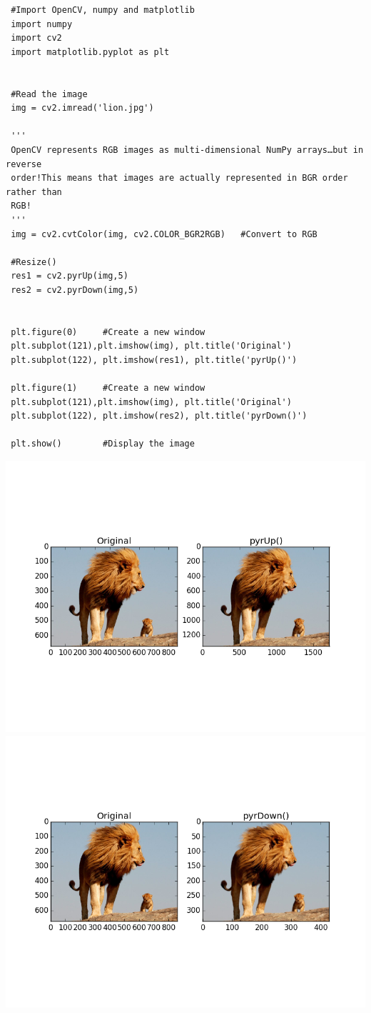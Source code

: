 \documentclass[]{article}
\begin{document}
\begin{verbatim}
 #Import OpenCV, numpy and matplotlib
 import numpy
 import cv2
 import matplotlib.pyplot as plt


 #Read the image
 img = cv2.imread('lion.jpg')

 '''
 OpenCV represents RGB images as multi-dimensional NumPy arrays…but in reverse
 order!This means that images are actually represented in BGR order rather than
 RGB!
 '''
 img = cv2.cvtColor(img, cv2.COLOR_BGR2RGB)   #Convert to RGB

 #Resize()
 res1 = cv2.pyrUp(img,5)
 res2 = cv2.pyrDown(img,5)


 plt.figure(0)     #Create a new window
 plt.subplot(121),plt.imshow(img), plt.title('Original')
 plt.subplot(122), plt.imshow(res1), plt.title('pyrUp()')

 plt.figure(1)     #Create a new window
 plt.subplot(121),plt.imshow(img), plt.title('Original')
 plt.subplot(122), plt.imshow(res2), plt.title('pyrDown()')

 plt.show()        #Display the image
\end{verbatim}

\includegraphics{pyrUp().png}
\includegraphics{pyrDown().png}
\end{document}
